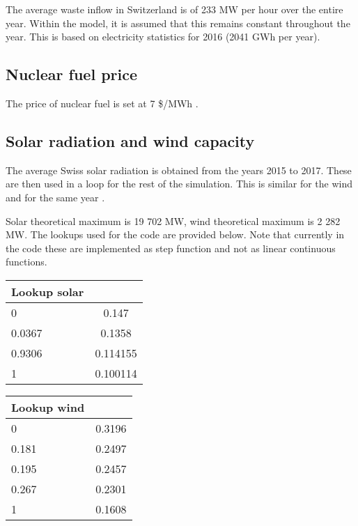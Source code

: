 The average waste inflow in Switzerland is of 233 MW per hour over the entire year. Within the model, it is assumed that this remains constant throughout the year. This is based on electricity statistics for 2016 (2041 GWh per year).


\subsection{Nuclear fuel price}

The price of nuclear fuel is set at 7 \$/MWh \citep{NREL2018annual}.


\subsection{Solar radiation and wind capacity}

The average Swiss solar radiation is obtained from the years 2015 to 2017. These are then used in a loop for the rest of the simulation. This is similar for the wind and for the same year \citep{sfoe2018Elektrizitatsstatistik}.

Solar theoretical maximum is 19 702 MW, wind theoretical maximum is 2 282 MW. The lookups used for the code are provided below. Note that currently in the code these are implemented as step function and not as linear continuous functions.

\begin{center}
\begin{tabular}{ |l|c| } 
\hline
Lookup solar
		& 	\\ \hline \hline
0		& 0.147		\\ \hline
0.0367	& 0.1358		\\ \hline
0.9306	& 0.114155	\\ \hline
1		& 0.100114	\\ \hline
\end{tabular}
\end{center}


\begin{center}
\begin{tabular}{ |l|c| } 
\hline
Lookup wind
		& 	\\ \hline \hline
0		& 0.3196	\\ \hline
0.181	& 0.2497	\\ \hline
0.195	& 0.2457	\\ \hline
0.267	& 0.2301	\\ \hline
1		& 0.1608	\\ \hline
\end{tabular}
\end{center}

